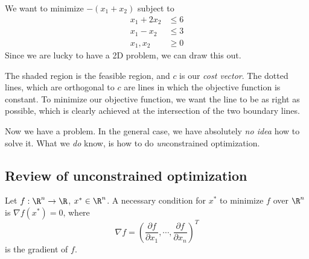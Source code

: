 \documentclass[a4paper]{article}
\begin{document}
\begin{eg}
  We want to minimize $-(x_1 + x_2)$ subject to
  \begin{align*}
    x_1 + 2x_2 &\leq 6\\
    x_1 - x_2 &\leq 3\\
    x_1, x_2 &\geq 0
  \end{align*}
  Since we are lucky to have a 2D problem, we can draw this out.

  \begin{center}
  \end{center}
  The shaded region is the feasible region, and $c$ is our \emph{cost vector}. The dotted lines, which are orthogonal to $c$ are lines in which the objective function is constant. To minimize our objective function, we want the line to be as right as possible, which is clearly achieved at the intersection of the two boundary lines.
\end{eg}
Now we have a problem. In the general case, we have absolutely \emph{no idea} how to solve it. What we \emph{do} know, is how to do \emph{un}constrained optimization.

\subsection{Review of unconstrained optimization}
Let $f: \R^n \to \R$, $x^*\in \R^n$. A necessary condition for $x^*$ to minimize $f$ over $\R^n$ is $\nabla f(x^*) = 0$, where
\[
  \nabla  f = \left(\frac{\partial f}{\partial x_1}, \cdots, \frac{\partial f}{\partial x_n}\right)^T
\]
is the gradient of $f$.
\end{document}
